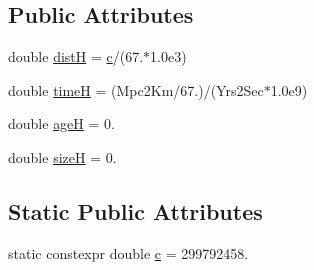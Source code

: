 \subsection*{Public Attributes}
\begin{DoxyCompactItemize}
\item 
double \hyperlink{class_universe_aa9e574f4cac819cfa806f24c24eec60e}{dist\-H} = \hyperlink{class_universe_a397c3302597d221feaaacac332837fd2}{c}/(67.$\ast$1.\-0e3)
\item 
double \hyperlink{class_universe_a7a1b9c18475efced2a8260420dfc3911}{time\-H} = (Mpc2\-Km/67.)/(Yrs2\-Sec$\ast$1.\-0e9)
\item 
double \hyperlink{class_universe_a478a9072a4445f6fc3dd9cf2bc641683}{age\-H} = 0.
\item 
double \hyperlink{class_universe_af2ce871543e110d45306c37c705b0574}{size\-H} = 0.
\end{DoxyCompactItemize}
\subsection*{Static Public Attributes}
\begin{DoxyCompactItemize}
\item 
static constexpr double \hyperlink{class_universe_a397c3302597d221feaaacac332837fd2}{c} = 299792458.
\end{DoxyCompactItemize}
